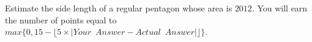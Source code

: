 Estimate the side length of a regular pentagon whose area is $2012$. You will earn the number of points equal to $max\{0, 15 - \lfloor 5 \times |Your \,\,\,Answer - Actual  \,\,\,Answer| \rfloor \}$.
